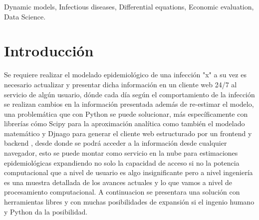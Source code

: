 \begin{IEEEkeywords}
Dynamic models, Infectious diseases, Differential equations, Economic evaluation, Data Science.
\end{IEEEkeywords}






%
\IEEEpeerreviewmaketitle



\section{Introducción}
Se requiere realizar el modelado epidemiológico de una infección "x" a su vez es necesario actualizar y presentar dicha información en un cliente web 24/7 al servicio de algún usuario, dónde cada día según el comportamiento de la infección se realizan cambios en la información presentada además de re-estimar el modelo, una problemática que con Python se puede solucionar, más específicamente con librerías cómo Scipy para la aproximación analítica como también el modelado matemático y Djnago para generar el cliente web estructurado por un frontend y backend \cite{djnago}, desde donde se podrá acceder a la información desde cualquier navegador, esto se puede montar como servicio en la nube para estimaciones epidemiológicas expandiendo no solo la capacidad de acceso si no la potencia computacional que a nivel de usuario es algo insignificante pero a nivel ingeniería es una muestra detallada de los avances actuales y lo que vamos a nivel de procesamiento computacional.
A continuacion se presentara una solución con herramientas libres y con muchas posibilidades de expansión si el ingenio humano y Python da la posibilidad.
 
